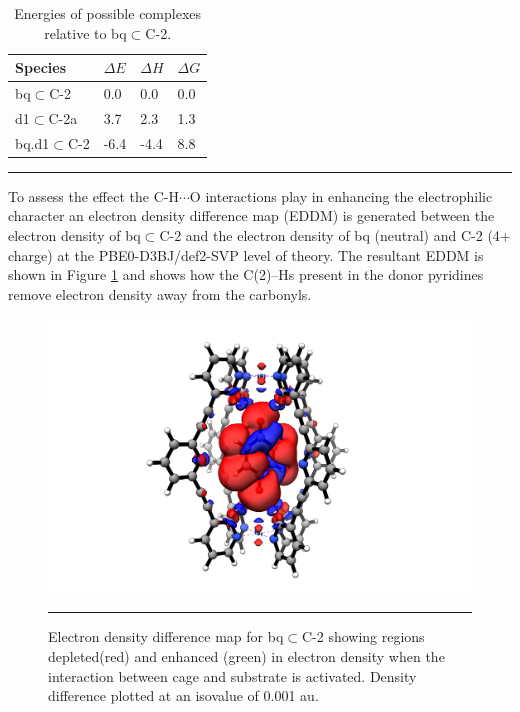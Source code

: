 \documentclass[../../main.tex]{subfiles}
\begin{document}
\begin{table}[h!]
	\def\arraystretch{1.7}
	\begin{tabularx}{\textwidth}{YYYY}
		\hline
		Species&	$\Delta E$	&$\Delta H$	&$\Delta G$
\\
		\hline
		bq$\subset$C-2	&0.0&	0.0&	0.0
\\
		d1$\subset$C-2a &3.7&	2.3	&1.3
\\
		bq.d1$\subset$C-2	&-6.4&	-4.4&	8.8
\\
		
	\end{tabularx}
	\hrule
	\vspace{0.2cm}
	\caption{Energies of possible complexes relative to bq$\subset$C-2.}
	\label{table::si_da_16}
\end{table}


To assess the effect the C-H$\cdots$O interactions play in enhancing the electrophilic character an electron density difference map (EDDM)  is generated between the electron density of bq$\subset$C-2 and the electron density of bq (neutral) and C-2 (4+ charge) at the PBE0-D3BJ/def2-SVP level of theory. The resultant EDDM is shown in Figure \ref{fig::si_da_24} and shows how the C(2)–Hs present in the donor pyridines remove electron density away from the carbonyls.

\begin{figure}[h!]
	\vspace{0.4cm}
	\centering
	\includegraphics[width=\textwidth]{3/da//figs/figS24}
	\vspace{0.2cm}
	\hrule
	\caption{Electron density difference map for bq$\subset$C-2 showing regions depleted(red) and enhanced (green) in electron density when the interaction between cage and substrate is activated. Density difference plotted at an isovalue of 0.001 au.}
	\label{fig::si_da_24}
\end{figure}
\end{document}
